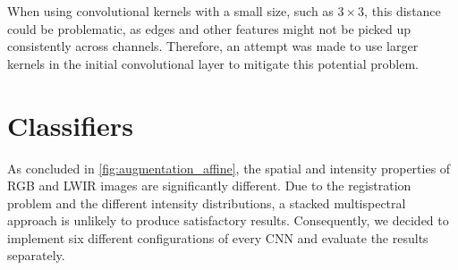 \documentclass{l4proj}
\begin{document}
When using convolutional kernels with a small size, such as $3 \times 3$, this distance could be problematic, as edges and other features might not be picked up consistently across channels. Therefore, an attempt was made to use larger kernels in the initial convolutional layer to mitigate this potential problem.


\section{Classifiers}

As concluded in \ref{fig:augmentation_affine}, the spatial and intensity properties of RGB and LWIR images are significantly different. Due to the registration problem and the different intensity distributions, a stacked multispectral approach is unlikely to produce satisfactory results. Consequently, we decided to implement six different configurations of every CNN and evaluate the results separately.
\end{document}
